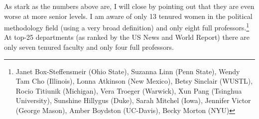 \documentclass[12pt]{texMemo}
\begin{document}
As stark as the numbers above are, I will close by pointing out that they are even worse at more senior levels. I am aware of only 13 tenured women in the political methodology field (using a very broad definition) and only eight full professors.\footnote{Janet Box-Steffensmeir (Ohio State), Suzanna Linn (Penn State), Wendy Tam Cho (Illinois), Lonna Atkinson (New Mexico), Betsy Sinclair (WUSTL), Rocio Titiunik (Michigan), Vera Troeger (Warwick), Xun Pang (Tsinghua University), Sunshine Hillygus (Duke), Sarah Mitchel (Iowa), Jennifer Victor (George Mason), Amber Boydston (UC-Davis), Becky Morton (NYU) } At top-25 departments (as ranked by the US News and World Report) there are only seven tenured faculty and only four full professors. 
\end{document}
